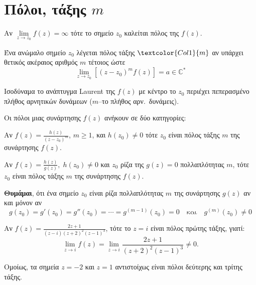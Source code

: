 \section*{Πόλοι, τάξης \ensuremath{ m }}

\begin{dfn} 
  Αν $\lim\limits_{z\to z_0}f(z)=\infty$ τότε το σημείο $z_0$ καλείται 
  \textcolor{Col1}{πόλος} της $f(z)$. 
\end{dfn}

\begin{dfn}
  Ένα ανώμαλο σημείο $z_0$ λέγεται \textcolor{Col1}{πόλος τάξης} 
  $\textcolor{Col1}{m}$ αν υπάρχει θετικός ακέραιος αριθμός $m$ τέτοιος ώστε 
  \[
    \lim\limits_{z\to z_0}\left[(z-z_0)^mf(z)\right]=a \in \mathbb{C}^{*}
  \]
  \begin{myitemize}
    \item Ισοδύναμα το ανάπτυγμα Laurent της $f(z)$ \textcolor{Col2}{με κέντρο το $z_0$} 
      περιέχει πεπερασμένο πλήθος αρνητικών δυνάμεων ($m$--το πλήθος αρν.\ δυνάμεις). 
  \end{myitemize}
\end{dfn}

\begin{rem}
  Οι πόλοι μιας συνάρτησης $ f(z) $ ανήκουν σε δύο κατηγορίες:
  \begin{myitemize}
    \item Αν $ f(z) = \frac{h(z)}{(z-z_{0})^{m}}$, $m \geq 1 $, και $ h(z_{0}) \neq 0 $ 
      τότε $ z_{0} $ είναι πόλος τάξης $ m $ της συνάρτησης $f(z)$.
    \item Αν $ f(z) = \frac{h(z)}{g(z)}, \; h(z_{0}) \neq 0 $ και $ z_{0} $ ρίζα της 
      $ g(z) = 0 $ πολλαπλότητας $ m $, τότε $ z_{0} $ είναι πόλος τάξης $ m
      $ της συνάρτησης $f(z)$.
  \end{myitemize}
\end{rem}

\begin{rem}
  \textbf{Θυμάμαι}, ότι ένα σημείο $ z_{0} $ είναι ρίζα \textcolor{Col1}{πολλαπλότητας 
  $ m $} της συνάρτησης $ g(z) $ αν και μόνον αν 
  \[
    g(z_{0}) = g'(z_{0}) = g''(z_{0}) = \cdots = g^{(m-1)}(z_{0}) = 0 \quad \text{και} 
    \quad g^{(m)}(z_{0}) \neq 0 
  \] 
\end{rem}

\begin{example}
  Αν $f(z)=\frac{2z+1}{(z-i)(z+2)^2(z-1)^3}$, τότε το $z=i$ είναι πόλος πρώτης τάξης, 
  γιατί: 
  \[
    \lim\limits_{z\to i}f(z)=\lim\limits_{z\to i}\frac{2z+1}{(z+2)^2(z-1)^3}\neq 0.
  \]

  Ομοίως, τα σημεία $z=-2$ και $z=1$ αντιστοίχως είναι πόλοι δεύτερης και τρίτης τάξης.
\end{example}

